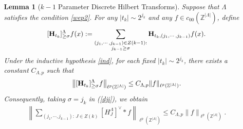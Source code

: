 \documentclass[10pt,a4paper]{amsart}
\newtheorem{lemma}{Lemma}\numberwithin{lemma}{section}
\numberwithin{equation}{section}
\begin{document}
\begin{lemma}[$k\!-\!1$ Parameter Discrete Hilbert Transforms]\label{ii11}
Suppose that $\Lambda$ satisfies the condition   \eqref{wep2}. For any $|t_k|\sim 2^{j_k}$ and any $f\in c_{00}(\mathbb{Z}^{|\Lambda|})$, define
\begin{align}\label{34m}
[{\bf H}_{t_k}]^{\Lambda}_{\ge \sigma}f(x)
:=
\sum_{\substack{(j_1,\cdots,j_{k-1})\in Z(k-1):\\ j_{k-1}\ge \sigma}}
{\bf H}_{t_k,(j_1,\cdots,j_{k-1})}f(x).
\end{align}
Under the inductive hypothesis \eqref{ind}, for each fixed  $|t_k|\sim 2^{j_k}$, there exists a constant $C_{\Lambda,p}$ such that
\begin{align}\label{dji}
\left\| [{\bf H}_{t_k}]^{\Lambda}_{\ge \sigma}f \right\|_{\ell^p(\mathbb{Z}^{|\Lambda|})}
\le C_{\Lambda,p}\|f\|_{\ell^p(\mathbb{Z}^{|\Lambda|})}.
\end{align}
Consequently, taking $\sigma=j_k$ in (\ref{dji}), we obtain
\begin{align}\label{9nn2}
\left\|   
\sum_{(j_1,\cdots,j_{k-1}):\, J\in Z(k)}
[H_J^{\Lambda}]^{\vee}*f
\right\|_{\ell^p(\mathbb{Z}^{|\Lambda|})}
\le C_{\Lambda,p} \|f\|_{\ell^p(\mathbb{Z}^{|\Lambda|})}.
\end{align}
\end{lemma}



 
\end{document}
